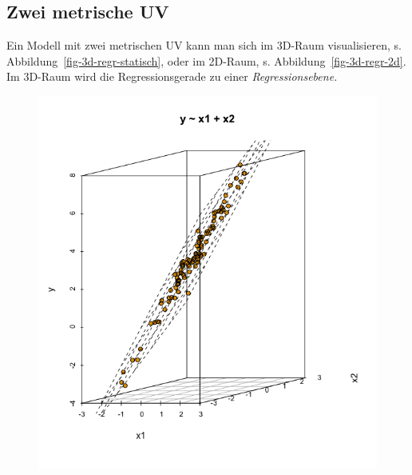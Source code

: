 \documentclass[
  a4paper,
]{scrbook}
\theoremstyle{definition}
\theoremstyle{definition}
\theoremstyle{definition}
\theoremstyle{remark}
\begin{document}
\subsection{Zwei metrische UV}\label{zwei-metrische-uv}

Ein Modell mit zwei metrischen UV kann man sich im 3D-Raum
visualisieren, s. Abbildung~\ref{fig-3d-regr-statisch}, oder im 2D-Raum,
s. Abbildung~\ref{fig-3d-regr-2d}. Im 3D-Raum wird die Regressionsgerade
zu einer \emph{Regressionsebene.}

\begin{figure}

\begin{minipage}{0.33\linewidth}

\includegraphics{img/3d_scatter1.png}

\end{minipage}%
%
\begin{minipage}{0.33\linewidth}


\end{minipage}
\end{figure}
\end{document}
